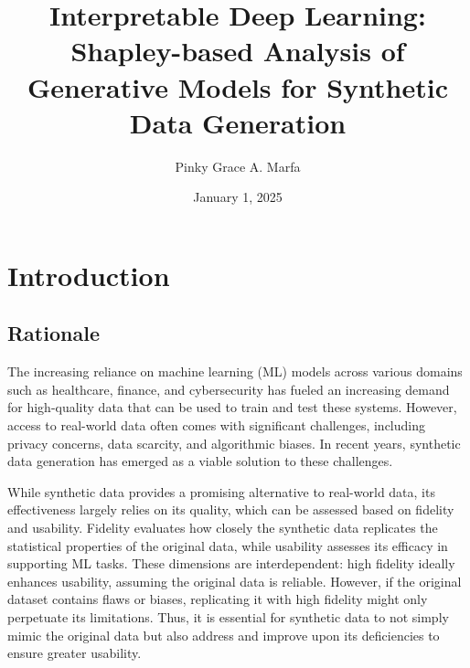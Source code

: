 \documentclass{article}
\title{Interpretable Deep Learning: Shapley-based Analysis of Generative Models for Synthetic Data Generation}
\begin{document}
\author{Pinky Grace A. Marfa}
\date{January 1, 2025}

\maketitle

\newpage

\tableofcontents
\thispagestyle{empty} %
\newpage
\setcounter{page}{1}  %

\section{Introduction}

\subsection{Rationale}
The increasing reliance on machine learning (ML) models across various domains such as healthcare, finance, and cybersecurity has fueled an increasing demand for high-quality data that can be used to train and test these systems. However, access to real-world data often comes with significant challenges, including privacy concerns, data scarcity, and algorithmic biases. In recent years, synthetic data generation has emerged as a viable solution to these challenges.

While synthetic data provides a promising alternative to real-world data, its effectiveness largely relies on its quality, which can be assessed based on fidelity and usability. Fidelity evaluates how closely the synthetic data replicates the statistical properties of the original data, while usability assesses its efficacy in supporting ML tasks. These dimensions are interdependent: high fidelity ideally enhances usability, assuming the original data is reliable. However, if the original dataset contains flaws or biases, replicating it with high fidelity might only perpetuate its limitations. Thus, it is essential for synthetic data to not simply mimic the original data but also address and improve upon its deficiencies to ensure greater usability.
\end{document}
